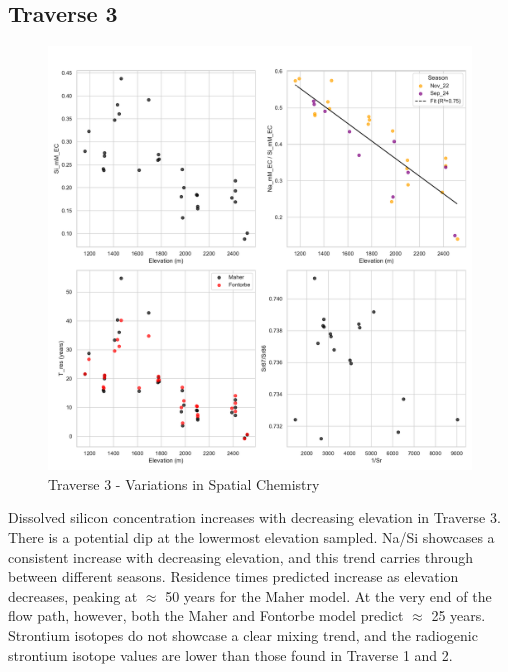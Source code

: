 \newpage

\subsection{Traverse 3}

\begin{figure}[h]
    \centering
        \includegraphics[width=\textwidth]{Traverse_3_summary.pdf}
    \caption{Traverse 3 - Variations in Spatial Chemistry}
    \label{fig:spatial_changes_spring3}
\end{figure}

\FloatBarrier

Dissolved silicon concentration increases with decreasing elevation in Traverse 3. There is a potential dip at the lowermost elevation sampled. Na/Si showcases a consistent increase with decreasing elevation, and this trend carries through between different seasons. Residence times predicted increase as elevation decreases, peaking at $\approx$ 50 years for the Maher model. At the very end of the flow path, however, both the Maher and Fontorbe model predict $\approx$ 25 years. Strontium isotopes do not showcase a clear mixing trend, and the radiogenic strontium isotope values are lower than those found in Traverse 1 and 2. 


\newpage

